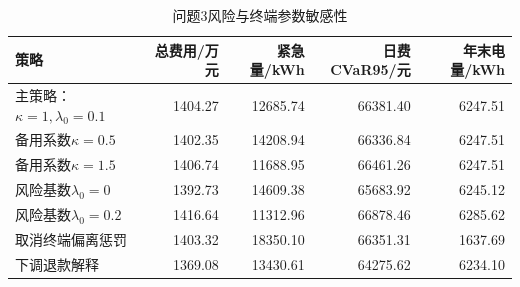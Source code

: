 \begin{table}[htbp]\centering\small\caption{问题3风险与终端参数敏感性}
\label{tab:sensitivity}
\begin{tabularx}{\linewidth}{LRRRR}\toprule
策略 & 总费用/万元 & 紧急量/kWh & 日费CVaR95/元 & 年末电量/kWh\\\midrule
主策略：$\kappa=1,\lambda_0=0.1$ & 1404.27 & 12685.74 & 66381.40 & 6247.51\\
备用系数$\kappa=0.5$ & 1402.35 & 14208.94 & 66336.84 & 6247.51\\
备用系数$\kappa=1.5$ & 1406.74 & 11688.95 & 66461.26 & 6247.51\\
风险基数$\lambda_0=0$ & 1392.73 & 14609.38 & 65683.92 & 6245.12\\
风险基数$\lambda_0=0.2$ & 1416.64 & 11312.96 & 66878.46 & 6285.62\\
取消终端偏离惩罚 & 1403.32 & 18350.10 & 66351.31 & 1637.69\\
下调退款解释 & 1369.08 & 13430.61 & 64275.62 & 6234.10\\
\bottomrule\end{tabularx}\end{table}